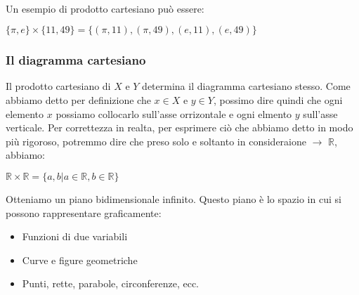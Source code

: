 \documentclass[article,12pt]{book}
\begin{document}
\begin{enumerate}
\begin{center}
\end{center}
\\
Un esempio di prodotto cartesiano può essere: 
    \begin{center}
        $\{\pi,e\}\times\{11,49\}=\{(\pi,11),(\pi,49),(e,11),(e,49)\}$
    
    \end{center}

\subsubsection{Il diagramma cartesiano}
Il prodotto cartesiano di $X$ e $Y$ determina il diagramma cartesiano stesso.
Come abbiamo detto per definizione che $x \in X$ e $y \in Y$, possimo dire quindi che ogni elemento $x$ possiamo collocarlo sull'asse orrizontale e ogni elmento $y$ sull'asse verticale.
Per correttezza in realta, per esprimere ciò che abbiamo detto in modo più rigoroso, potremmo dire che preso solo e soltanto in consideraione $\rightarrow$ $\mathbb{R}$, abbiamo: 
    \begin{center}
        $\mathbb{R}\times\mathbb{R} = \{a,b|a \in \mathbb{R}, b \in \mathbb{R}\}$
    \end{center}
\newpage
Otteniamo un piano bidimensionale infinito. Questo piano è lo spazio in cui si possono rappresentare graficamente:
    \begin{itemize}
        \item Funzioni di due variabili
        \item Curve e figure geometriche
        \item Punti, rette, parabole, circonferenze, ecc.
    \end{itemize}

\begin{center}
    
\end{center}
\end{enumerate}
\end{document}
